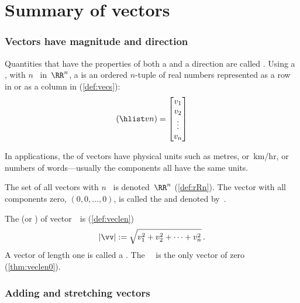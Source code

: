 
\section{Summary of vectors}
\label{sec:sumv}


\begin{itemize}
\def\index#1{}%

\subsubsection{Vectors have magnitude and direction}

\itemme Quantities that have the properties of both a  and a direction are called .  
Using a , with \(n\)~ in~\(\RR^n\), a  is an ordered \(n\)-tuple of real numbers represented as a row in  or as a column in  (\autoref{def:vecs}):
\begin{equation*}
(\hlist vn)=\begin{bmatrix} v_1\\v_2\\\vdots\\v_n \end{bmatrix}
\end{equation*}

In applications, the  of vectors have physical units such as metres, or~km/hr, or numbers of words---usually the components all have the same units.

\itemme The set of all vectors with \(n\)~ is denoted~\(\RR^n\) (\autoref{def:rRn}).
The vector with all components zero,  \((0,0,\ldots,0)\), is called the  and denoted by~\ov.

\itemhi  The  (or ) of vector~\vv\  is  (\autoref{def:veclen})
\begin{equation*}
|\vv|:=\sqrt{v_1^2+v_2^2+\cdots+v_n^2}\,.
\end{equation*}
A vector of length one is called a .
The ~\ov\ is the only vector of  zero (\autoref{thm:veclen0}).




\subsubsection{Adding and stretching vectors}


\end{itemize}

